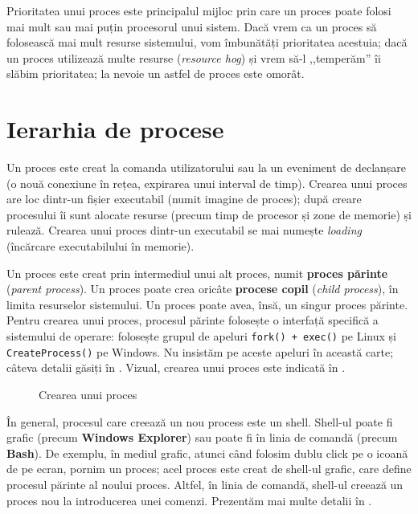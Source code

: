 Prioritatea unui proces este principalul mijloc prin care un proces poate folosi
mai mult sau mai puțin procesorul unui sistem. Dacă vrem ca un proces să
folosească mai mult resurse sistemului, vom îmbunătăți prioritatea acestuia;
dacă un proces utilizează multe resurse (\textit{resource hog}) și vrem să-l
,,temperăm'' îi slăbim prioritatea; la nevoie un astfel de proces este omorât.

\section{Ierarhia de procese}
\label{sec:process-ierarhie}

Un proces este creat la comanda utilizatorului sau la un eveniment de declanșare
(o nouă conexiune în rețea, expirarea unui interval de timp). Crearea unui
proces are loc dintr-un fișier executabil (numit imagine de proces); după creare
procesului îi sunt alocate resurse (precum timp de procesor și zone de memorie)
și rulează. Crearea unui proces dintr-un executabil se mai numește
\textit{loading} (încărcare executabilului în memorie).

Un proces este creat prin intermediul unui alt proces, numit \textbf{proces părinte} (\textit{parent process}). Un
proces poate crea oricâte \textbf{procese copil} (\textit{child process}), în limita resurselor sistemului. Un
proces poate avea, însă, un singur proces părinte. Pentru crearea unui proces,
procesul părinte folosește o interfață specifică a sistemului de operare:
folosește grupul de apeluri \texttt{fork() + exec()} pe Linux și \texttt{CreateProcess()} pe
Windows. Nu insistăm pe aceste apeluri în această carte; câteva detalii găsiți
în . Vizual,
crearea unui proces este indicată în .

\begin{figure}[!htbp]
	\centering
	\def\svgwidth{0.8\textwidth}
	
	\caption{Crearea unui proces}
	\label{fig:process-create}
\end{figure}

În general, procesul care creează un nou process este un shell. Shell-ul poate
fi grafic (precum \textbf{Windows Explorer}) sau poate fi în linia de comandă (precum
\textbf{Bash}). De exemplu, în mediul grafic, atunci când folosim dublu click pe o icoană
de pe ecran, pornim un proces; acel proces este creat de shell-ul grafic, care
define procesul părinte al noului proces. Altfel, în linia de comandă, shell-ul
creează un proces nou la introducerea unei comenzi. Prezentăm mai multe detalii
în .

